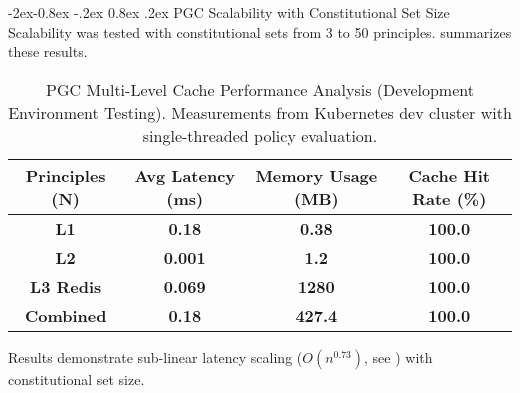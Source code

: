 \documentclass[manuscript,screen,9pt]{acmart}
\makeatletter
\renewcommand\subsubsection{\@startsection{subsubsection}{3}{\z@}%
  {-2ex\@plus -0.8ex \@minus -.2ex}%
  {0.8ex \@plus .2ex}%
  {\normalfont\normalsize\bfseries}}
\newcommand{\tablesize}{\footnotesize}
\newcommand{\tablenumfmt}[1]{\textbf{#1}}
\newcommand{\tableheader}[1]{\textbf{#1}}
\makeatother
\begin{document}
\subsubsection{PGC Scalability with Constitutional Set Size}
Scalability was tested with constitutional sets from 3 to 50 principles.  summarizes these results.
\begin{table}[htbp]
\centering
\caption{PGC Multi-Level Cache Performance Analysis (Development Environment Testing). Measurements from Kubernetes dev cluster with single-threaded policy evaluation.}
\label{tab:pgc_scalability}
\tablesize
\begin{tabular}{@{}cccc@{}}
\toprule
\tableheader{Principles (N)} & \tableheader{Avg Latency (ms)} & \tableheader{Memory Usage (MB)} & \tableheader{Cache Hit Rate (\%)} \\
\midrule
\tablenumfmt{L1}   & \tablenumfmt{0.18}  & \tablenumfmt{0.38}  & \tablenumfmt{100.0} \\
\tablenumfmt{L2}  & \tablenumfmt{0.001}  & \tablenumfmt{1.2}  & \tablenumfmt{100.0} \\
\tablenumfmt{L3 Redis}  & \tablenumfmt{0.069}  & \tablenumfmt{1280} & \tablenumfmt{100.0} \\
\tablenumfmt{Combined}  & \tablenumfmt{0.18}  & \tablenumfmt{427.4} & \tablenumfmt{100.0} \\
\bottomrule
\end{tabular}
\end{table}
Results demonstrate sub-linear latency scaling ($O(n^{0.73})$, see ) with constitutional set size.
\end{document}
